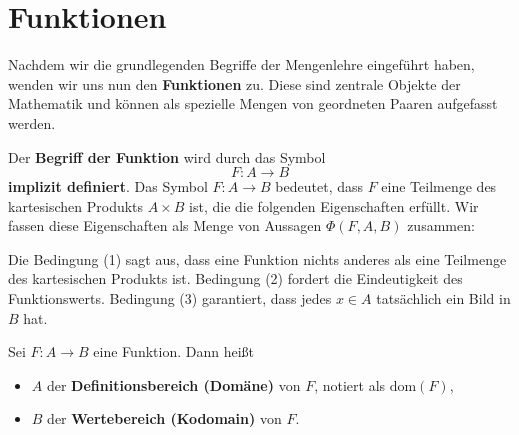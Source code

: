 \documentclass[main.tex]{subfiles}
\begin{document}
\begin{tabproof}
\end{tabproof}

\chapter{Funktionen}
Nachdem wir die grundlegenden Begriffe der Mengenlehre eingeführt haben, wenden wir uns nun den 
\textbf{Funktionen} zu. Diese sind zentrale Objekte der Mathematik und können als spezielle Mengen 
von geordneten Paaren aufgefasst werden.

\begin{definition}
Der \textbf{Begriff der Funktion} wird durch das Symbol
\[
F\colon A \to B
\]
\textbf{implizit definiert}. 
Das Symbol \(F\colon A\to B\) bedeutet, dass \(F\) eine Teilmenge des kartesischen Produkts \(A\times B\) ist,
die die folgenden Eigenschaften erfüllt. Wir fassen diese Eigenschaften als Menge von Aussagen 
\(\Phi(F,A,B)\) zusammen:
\end{definition}




\begin{remark}
Die Bedingung (1) sagt aus, dass eine Funktion nichts anderes als eine Teilmenge des kartesischen Produkts ist.  
Bedingung (2) fordert die Eindeutigkeit des Funktionswerts.  
Bedingung (3) garantiert, dass jedes \(x\in A\) tatsächlich ein Bild in \(B\) hat.  
\end{remark}

\begin{definition}
Sei \(F\colon A\to B\) eine Funktion. Dann heißt
\begin{itemize}
  \item \(A\) der \textbf{Definitionsbereich (Domäne)} von \(F\), notiert als \(\mathrm{dom}(F)\),
  \item \(B\) der \textbf{Wertebereich (Kodomain)} von \(F\).
\end{itemize}
\end{definition}
\end{document}
